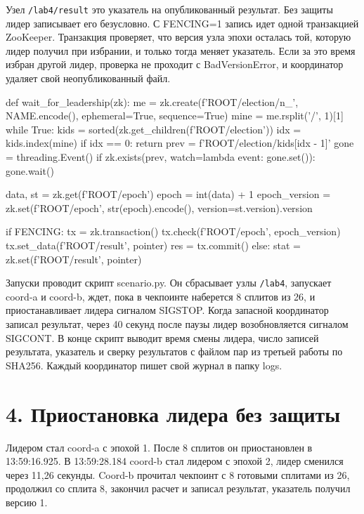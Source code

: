 Узел \texttt{/lab4/result} это указатель на опубликованный результат. Без
защиты лидер записывает его безусловно. С FENCING=1 запись идет одной
транзакцией ZooKeeper. Транзакция проверяет, что версия узла эпохи осталась
той, которую лидер получил при избрании, и только тогда меняет указатель.
Если за это время избран другой лидер, проверка не проходит с
BadVersionError, и координатор удаляет свой неопубликованный файл.

\begin{code}
def wait_for_leadership(zk):
    me = zk.create(f'{ROOT}/election/n_', NAME.encode(), ephemeral=True, sequence=True)
    mine = me.rsplit('/', 1)[1]
    while True:
        kids = sorted(zk.get_children(f'{ROOT}/election'))
        idx = kids.index(mine)
        if idx == 0:
            return
        prev = f'{ROOT}/election/{kids[idx - 1]}'
        gone = threading.Event()
        if zk.exists(prev, watch=lambda event: gone.set()):
            gone.wait()

data, st = zk.get(f'{ROOT}/epoch')
epoch = int(data) + 1
epoch_version = zk.set(f'{ROOT}/epoch', str(epoch).encode(), version=st.version).version

if FENCING:
    tx = zk.transaction()
    tx.check(f'{ROOT}/epoch', epoch_version)
    tx.set_data(f'{ROOT}/result', pointer)
    res = tx.commit()
else:
    stat = zk.set(f'{ROOT}/result', pointer)
\end{code}

Запуски проводит скрипт scenario.py. Он сбрасывает узлы \texttt{/lab4},
запускает coord-a и coord-b, ждет, пока в чекпоинте наберется 8 сплитов из
26, и приостанавливает лидера сигналом SIGSTOP. Когда запасной координатор
записал результат, через 40 секунд после паузы лидер возобновляется сигналом
SIGCONT. В конце скрипт выводит время смены лидера, число записей
результата, указатель и сверку результатов с файлом пар из третьей работы по
SHA256. Каждый координатор пишет свой журнал в папку logs.

\section{4. Приостановка лидера без защиты}

Лидером стал coord-a с эпохой 1. После 8 сплитов он приостановлен в
13:59:16.925. В 13:59:28.184 coord-b стал лидером с эпохой 2, лидер сменился
через 11,26 секунды. Coord-b прочитал чекпоинт с 8 готовыми сплитами из 26,
продолжил со сплита 8, закончил расчет и записал результат, указатель
получил версию 1.


